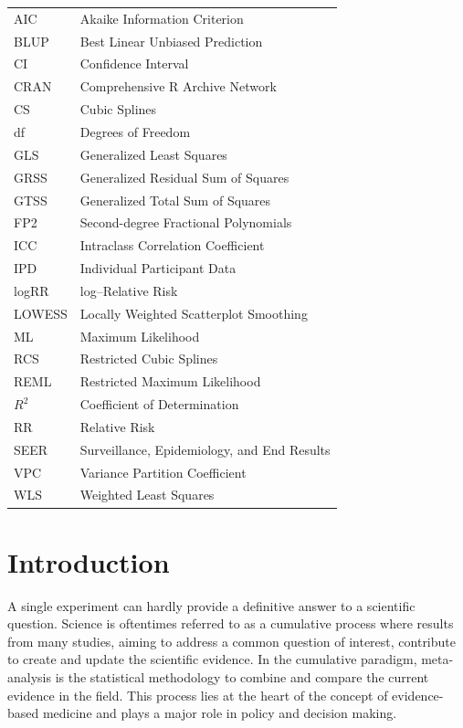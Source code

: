 \documentclass[11pt,a4paper,twoside,openany]{book}\usepackage{knitr}
\begin{document}
{{\begin{tabular}{ll}
AIC & Akaike Information Criterion \\
BLUP & Best Linear Unbiased Prediction \\
CI & Confidence Interval \\
CRAN & Comprehensive R Archive Network \\
CS & Cubic Splines \\
df & Degrees of Freedom \\
GLS & Generalized Least Squares \\
GRSS & Generalized Residual Sum of Squares \\
GTSS & Generalized Total Sum of Squares \\
FP2 & Second-degree Fractional Polynomials \\
ICC & Intraclass Correlation Coefficient \\
IPD & Individual Participant Data \\
logRR & log--Relative Risk \\
LOWESS & Locally Weighted Scatterplot Smoothing \\
ML & Maximum Likelihood \\
RCS & Restricted Cubic Splines \\
REML & Restricted Maximum Likelihood \\
$R^2$ & Coefficient of Determination \\
RR & Relative Risk \\
SEER & Surveillance, Epidemiology, and End Results \\
VPC & Variance Partition Coefficient \\
WLS & Weighted Least Squares


\end{tabular}

\mainmatter
\pagestyle{mainmatter}



%

\chapter{Introduction}

A single experiment can hardly provide a definitive answer to a scientific question. Science is oftentimes referred to as a cumulative process where results from many studies, aiming to address a common question of interest, contribute to create and update the scientific evidence. In the cumulative paradigm, meta-analysis is the statistical methodology to combine and compare the current evidence in the field. This process lies at the heart of the concept of evidence-based medicine and plays a major role in policy and decision making.

}}
\end{document}
